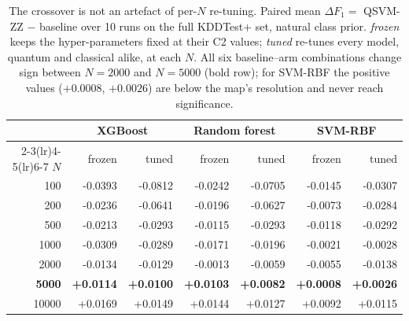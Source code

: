 \begin{table}[t]
\centering
\caption{The crossover is not an artefact of per-$N$ re-tuning. Paired mean
$\Delta F_1 = $ QSVM-ZZ $-$ baseline over 10 runs on the full KDDTest+ set,
natural class prior. \emph{frozen} keeps the hyper-parameters fixed at their
C2 values; \emph{tuned} re-tunes every model, quantum and classical alike, at
each $N$. All six baseline--arm combinations change sign between $N=2000$ and
$N=5000$ (bold row); for SVM-RBF the positive values ($+0.0008$, $+0.0026$)
are below the map's resolution and never reach significance.}
\label{tab:crossover-arms}
\footnotesize
\setlength{\tabcolsep}{4pt}
\begin{tabular}{@{}r rr rr rr@{}}
\toprule
 & \multicolumn{2}{c}{XGBoost} & \multicolumn{2}{c}{Random forest} & \multicolumn{2}{c}{SVM-RBF} \\
\cmidrule(lr){2-3}\cmidrule(lr){4-5}\cmidrule(lr){6-7}
$N$ & frozen & tuned & frozen & tuned & frozen & tuned \\
\midrule
100 & -0.0393 & -0.0812 & -0.0242 & -0.0705 & -0.0145 & -0.0307 \\
200 & -0.0236 & -0.0641 & -0.0196 & -0.0627 & -0.0073 & -0.0284 \\
500 & -0.0213 & -0.0293 & -0.0115 & -0.0293 & -0.0118 & -0.0292 \\
1000 & -0.0309 & -0.0289 & -0.0171 & -0.0196 & -0.0021 & -0.0028 \\
2000 & -0.0134 & -0.0129 & -0.0013 & -0.0059 & -0.0055 & -0.0138 \\
\textbf{5000} & \textbf{+0.0114} & \textbf{+0.0100} & \textbf{+0.0103} & \textbf{+0.0082} & \textbf{+0.0008} & \textbf{+0.0026} \\
10000 & +0.0169 & +0.0149 & +0.0144 & +0.0127 & +0.0092 & +0.0115 \\
\bottomrule
\end{tabular}
\end{table}
